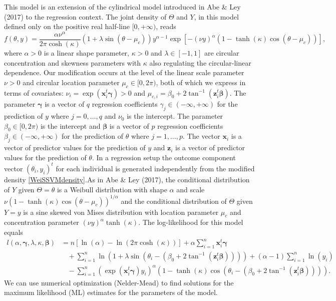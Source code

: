 \documentclass[12pt,]{article}
\begin{document}
This model is an extension of the cylindrical model introduced in Abe \&
Ley (2017) to the regression context. The joint density of \(\Theta\)
and \(Y\), in this model defined only on the positive real half-line
\([0, + \infty)\), reads \begin{equation}\label{WeiSSVMdensity}
f(\theta, y) = \frac{\alpha\nu^\alpha}{2\pi\cosh(\kappa)}
                 (1 +\lambda\sin(\theta - \mu_c))
                 y^{\alpha-1}
                 \exp[-(\nu y)^{\alpha}(1-\tanh(\kappa)\cos(\theta - \mu_c))],
\end{equation} \noindent where \(\alpha > 0\) is a linear shape
parameter, \(\kappa > 0\) and \(\lambda \in [-1, 1]\) are circular
concentration and skewness parameters with \(\kappa\) also regulating
the circular-linear dependence. Our modification occurs at the level of
the linear scale parameter \(\nu>0\) and circular location parameter
\(\mu_c\in [0, 2\pi)\), both of which we express in terms of covariates:
\(\nu_i = \exp(\boldsymbol{x}_i^t\boldsymbol{\gamma}) > 0\) and
\(\mu_{c,i} = \beta_0 + 2\tan^{-1}(\boldsymbol{z}_i^t\boldsymbol{\beta})\).
The parameter \(\boldsymbol{\gamma}\) is a vector of \(q\) regression
coefficients \(\gamma_j \in (-\infty, +\infty)\) for the prediction of
\(y\) where \(j = 0, \dots, q\) and \(\nu_0\) is the intercept. The
parameter \(\beta_0 \in [0, 2\pi)\) is the intercept and
\(\boldsymbol{\beta}\) is a vector of \(p\) regression coefficients
\(\beta_j \in (-\infty, +\infty)\) for the prediction of \(\theta\)
where \(j = 1, \dots, p\). The vector \(\boldsymbol{x}_i\) is a vector
of predictor values for the prediction of \(y\) and \(\boldsymbol{z}_i\)
is a vector of predictor values for the prediction of \(\theta\). In a
regression setup the outcome component vector \((\theta_i, y_i)^t\) for
each individual is generated independently from the modified density
\eqref{WeiSSVMdensity}.\newline \indent As in Abe \& Ley (2017), the
conditional distribution of \(Y\) given \(\Theta=\theta\) is a Weibull
distribution with shape \(\alpha\) and scale
\(\nu(1-\tanh(\kappa)\cos(\theta - \mu_c))^{1/\alpha}\) and the
conditional distribution of \(\Theta\) given \(Y=y\) is a sine skewed
von Mises distribution with location parameter \(\mu_c\) and
concentration parameter \((\nu y)^\alpha\tanh(\kappa)\). The
log-likelihood for this model equals
\begin{align}\label{WeiSSVMLikelihood}
l(\alpha, \boldsymbol{\gamma}, \lambda, \kappa, \boldsymbol{\beta}) 
   &= n[\ln(\alpha) - \ln(2\pi\cosh(\kappa))] + \alpha \sum^{n}_{i = 1} \boldsymbol{x}_i^t\boldsymbol{\gamma} \nonumber\\
   &\:\:\:\:+\sum^{n}_{i = 1} \ln(1 +\lambda\sin(\theta_i - (\beta_0 + 2\tan^{-1}(\boldsymbol{z}_i^t\boldsymbol{\beta})))) 
   +(\alpha-1)\sum^{n}_{i = 1} \ln(y_i) \nonumber\\
   &\:\:\:\:-\sum^{n}_{i = 1}( \exp(\boldsymbol{x}_i^t\boldsymbol{\gamma})y_i)^{\alpha}(1-\tanh(\kappa)\cos(\theta_i - (\beta_0 + 2\tan^{-1}(\boldsymbol{z}_i^t\boldsymbol{\beta})))).\nonumber
\end{align} \noindent We can use numerical optimization (Nelder-Mead) to
find solutions for the maximum likelihood (ML) estimates for the
parameters of the model.
\end{document}
